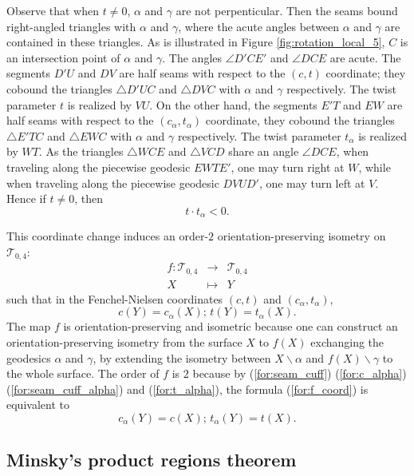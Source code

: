 \documentclass[UTF8]{amsart}
\numberwithin{equation}{section}
\theoremstyle{definition}
\theoremstyle{example}
\theoremstyle{remark}
\begin{document}
Observe that when $t\ne 0$, $\alpha$ and $\gamma$  are not perpenticular. Then the seams bound right-angled triangles with $\alpha$ and $\gamma$, where the acute angles between $\alpha$ and $\gamma$ are contained in these triangles. As is illustrated in Figure \ref{fig:rotation_local_5}, $C$ is an intersection point of $\alpha$ and $\gamma$. The angles $\angle D'CE'$ and $\angle DCE$ are acute. The segments $D'U$ and $DV$ are half seams with respect to the $(c,t)$ coordinate; they cobound the triangles $\triangle D'UC$ and $\triangle DVC$ with $\alpha$ and $\gamma$ respectively. The twist parameter $t$ is realized by $VU$.  On the other hand, the segments $E'T$ and $EW$ are half seams with respect to the $(c_{\alpha},t_{\alpha})$ coordinate, they cobound the triangles $\triangle E'TC$ and $\triangle EWC$ with $\alpha$ and $\gamma$ respectively. The twist parameter $t_{\alpha}$ is realized by $WT$. As the triangles $\triangle WCE$ and $\triangle VCD$ share an angle $\angle DCE$, when traveling along the piecewise geodesic $EWTE'$, one may turn right at $W$, while when traveling along the piecewise geodesic $DVUD'$, one may turn left at $V$. Hence 
if $t \ne 0$, then
\begin{equation}
 t\cdot t_{\alpha} <0. 
 \label{for:tt_alpha_neg}
\end{equation}

This coordinate change induces an order-$2$ orientation-preserving isometry on $\mathcal{T}_{0,4}$: 
\begin{eqnarray*}
 f: \mathcal{T}_{0,4} &\to & \mathcal{T}_{0,4} \\
 X &\mapsto& Y
\end{eqnarray*}
such that in the Fenchel-Nielsen coordinates $(c,t)$ and $(c_{\alpha}, t_{\alpha})$, 
\begin{equation}
 c(Y) = c_{\alpha}(X); \, t(Y) = t_{\alpha}(X). 
 \label{for:f_coord}
\end{equation}
The map $f$ is orientation-preserving and isometric because one can construct an orientation-preserving isometry from the surface $X$ to $f(X)$ exchanging the geodesics $\alpha$ and $\gamma$, by extending the isometry between $X \backslash \alpha$ and $f(X) \backslash\gamma$ to the whole surface. 
The order of $f$ is $2$ because by (\ref{for:seam_cuff}) (\ref{for:c_alpha}) (\ref{for:seam_cuff_alpha}) and (\ref{for:t_alpha}), the formula (\ref{for:f_coord}) is equivalent to 
\[
 c_{\alpha}(Y) = c(X); \, t_{\alpha}(Y) = t(X). 
\]


\subsection{Minsky's product regions theorem}
\end{document}
